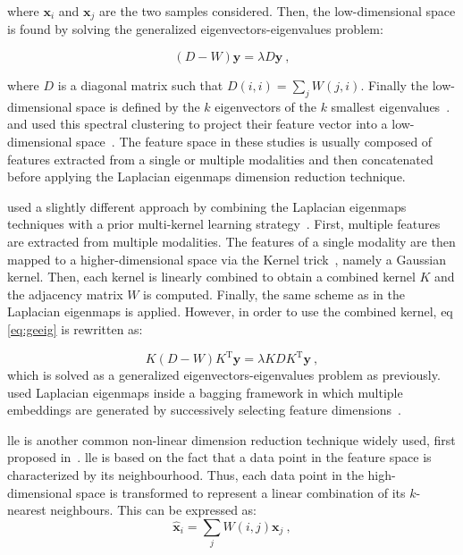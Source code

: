 \noindent where $\mathbf{x}_i$ and $\mathbf{x}_j$ are the two samples considered.
Then, the low-dimensional space is found by solving the generalized eigenvectors-eigenvalues problem:

\begin{equation}
	(D-W)\mathbf{y} = \lambda D \mathbf{y} \ ,
	\label{eq:geeig}
\end{equation}

\noindent where $D$ is a diagonal matrix such that $D(i,i) = \sum_j W(j,i)$.
Finally the low-dimensional space is defined by the $k$ eigenvectors of the $k$ smallest eigenvalues~\cite{Belkin2001}.
\citeauthor{Tiwari2009a} and \citeauthor{Viswanath2008} used this spectral clustering to project their feature vector into a low-dimensional space~\cite{Tiwari2007,Tiwari2009,Tiwari2009a,Viswanath2008}.
The feature space in these studies is usually composed of features extracted from a single or multiple modalities and then concatenated before applying the Laplacian eigenmaps dimension reduction technique.

\citeauthor{Tiwari2013} used a slightly different approach by combining the Laplacian eigenmaps techniques with a prior multi-kernel learning strategy~\cite{Tiwari2009,Tiwari2013}.
First, multiple features are extracted from multiple modalities.
The features of a single modality are then mapped to a higher-dimensional space via the Kernel trick~\cite{Aizerman1964}, namely a Gaussian kernel.
Then, each kernel is linearly combined to obtain a combined kernel $K$ and the adjacency matrix $W$ is computed.
Finally, the same scheme as in the Laplacian eigenmaps is applied.
However, in order to use the combined kernel, \acs{eq}\,\eqref{eq:geeig} is rewritten as:

\begin{equation}
  K (D-W) K^{\text{T}} \mathbf{y} = \lambda K D K^{\text{T}} \mathbf{y} \ ,
  \label{eq:sesmik}
\end{equation}
\noindent which is solved as a generalized eigenvectors-eigenvalues problem as previously.
\citeauthor{Viswanath2011} used Laplacian eigenmaps inside a bagging framework in which multiple embeddings are generated by successively selecting feature dimensions~\cite{Viswanath2011}.

\Ac{lle} is another common non-linear dimension reduction technique widely used, first proposed in~\cite{Roweis2000}.
\ac{lle} is based on the fact that a data point in the feature space is characterized by its neighbourhood.
Thus, each data point in the high-dimensional space is transformed to represent a linear combination of its $k$-nearest neighbours.
This can be expressed as:
\begin{equation}
	\hat{\mathbf{x}}_i = \sum_j W(i,j) \mathbf{x}_j \ ,
	\label{eq:lincomlle}
\end{equation}


